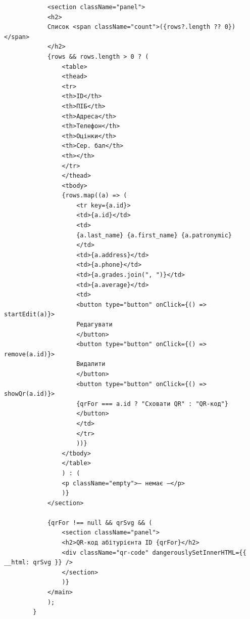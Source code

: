 \documentclass[14pt, a4paper]{extreport}
\begin{document}
\begin{verbatim}
			<section className="panel">
			<h2>
			Список <span className="count">({rows?.length ?? 0})</span>
			</h2>
			{rows && rows.length > 0 ? (
				<table>
				<thead>
				<tr>
				<th>ID</th>
				<th>ПІБ</th>
				<th>Адреса</th>
				<th>Телефон</th>
				<th>Оцінки</th>
				<th>Сер. бал</th>
				<th></th>
				</tr>
				</thead>
				<tbody>
				{rows.map((a) => (
					<tr key={a.id}>
					<td>{a.id}</td>
					<td>
					{a.last_name} {a.first_name} {a.patronymic}
					</td>
					<td>{a.address}</td>
					<td>{a.phone}</td>
					<td>{a.grades.join(", ")}</td>
					<td>{a.average}</td>
					<td>
					<button type="button" onClick={() => startEdit(a)}>
					Редагувати
					</button>
					<button type="button" onClick={() => remove(a.id)}>
					Видалити
					</button>
					<button type="button" onClick={() => showQr(a.id)}>
					{qrFor === a.id ? "Сховати QR" : "QR-код"}
					</button>
					</td>
					</tr>
					))}
				</tbody>
				</table>
				) : (
				<p className="empty">— немає —</p>
				)}
			</section>
			
			{qrFor !== null && qrSvg && (
				<section className="panel">
				<h2>QR-код абітурієнта ID {qrFor}</h2>
				<div className="qr-code" dangerouslySetInnerHTML={{ __html: qrSvg }} />
				</section>
				)}
			</main>
			);
		}
	\end{verbatim}
\end{document}
